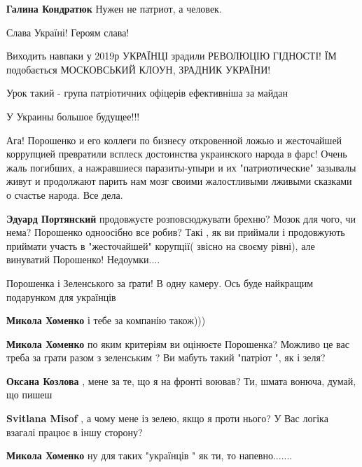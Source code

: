 \begin{itemize}
\begin{itemize} %
\textbf{Галина Кондратюк} Нужен не патриот, а человек.
\end{itemize} %

Слава Україні! Героям слава!

Виходить навпаки у 2019р УКРАЇНЦІ зрадили РЕВОЛЮЦІЮ ГІДНОСТІ! ЇМ подобається МОСКОВСЬКИЙ КЛОУН, ЗРАДНИК УКРАЇНИ!

Урок такий - група патріотичних офіцерів ефективніша за майдан

У Украины большое будущее!!!


Ага! Порошенко и его коллеги по бизнесу откровенной ложью и жесточайшей
коррупцией превратили всплеск достоинства украинского народа в фарс! Очень жаль
погибших, а нажравшиеся паразиты-упыри и их "патриотические" зазывалы живут и
продолжают парить нам мозг своими жалостливыми лживыми сказками о счастье
народа. Все дела.

\begin{itemize} %
\textbf{Эдуард Портянский} продовжуєте розповсюджувати брехню? Мозок для чого, чи нема? Порошенко одноосібно все робив? Такі , як ви приймали і продовжують приймати участь в "жесточайшей" корупції( звісно на своєму рівні), але винуватий Порошенко! Недоумки....
\end{itemize} %


Порошенка і Зеленського за ґрати! В одну камеру. Ось буде найкращим подарунком
для українців

\begin{itemize} %
\textbf{Микола Хоменко} і тебе за компанію також)))

\textbf{Микола Хоменко} по яким критеріям ви оцінюєте Порошенка?
Можливо це вас треба за грати разом з зеленським ? Ви мабуть такий "патріот ", як і зеля?

\textbf{Оксана Козлова} , мене за те, що я на фронті воював? Ти, шмата вонюча, думай, що пишеш

\textbf{Svitlana Misof} , а чому мене із зелею, якщо я проти нього? У Вас логіка взагалі працює в іншу сторону?

\textbf{Микола Хоменко} ну для таких "українців " як ти, то напевно.......


\end{itemize}
\end{itemize}
